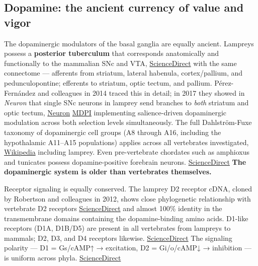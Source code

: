 \subsection{Dopamine: the ancient currency of value and vigor}\label{05_vertebrates-dopamine-the-ancient-currency-of-value-and-vigor}

The dopaminergic modulators of the basal ganglia are equally ancient. Lampreys possess a \textbf{posterior tuberculum} that corresponds anatomically and functionally to the mammalian SNc and VTA, \href{https://www.sciencedirect.com/science/chapter/handbook/abs/pii/B9780443298677000074}{ScienceDirect} with the same connectome --- afferents from striatum, lateral habenula, cortex/pallium, and pedunculopontine; efferents to striatum, optic tectum, and pallium. Pérez-Fernández and colleagues in 2014 traced this in detail; in 2017 they showed in \emph{Neuron} that single SNc neurons in lamprey send branches to \emph{both} striatum and optic tectum, \href{https://www.cell.com/neuron/fulltext/S0896-6273(17)30920-0}{Neuron} \href{https://mdpi.com/1422-0067/22/20/11284/htm}{MDPI} implementing salience-driven dopaminergic modulation across both selection levels simultaneously. The full Dahlström-Fuxe taxonomy of dopaminergic cell groups (A8 through A16, including the hypothalamic A11--A15 populations) applies across all vertebrates investigated, \href{https://en.wikipedia.org/wiki/Dopaminergic_cell_groups}{Wikipedia} including lamprey. Even pre-vertebrate chordates such as amphioxus and tunicates possess dopamine-positive forebrain neurons. \href{https://www.sciencedirect.com/science/chapter/handbook/abs/pii/B9780443298677000074}{ScienceDirect} \textbf{The dopaminergic system is older than vertebrates themselves.}

Receptor signaling is equally conserved. The lamprey D2 receptor cDNA, cloned by Robertson and colleagues in 2012, shows close phylogenetic relationship with vertebrate D2 receptors \href{https://www.sciencedirect.com/science/chapter/handbook/abs/pii/B9780443298677000074}{ScienceDirect} and almost 100\% identity in the transmembrane domains containing the dopamine-binding amino acids. D1-like receptors (D1A, D1B/D5) are present in all vertebrates from lampreys to mammals; D2, D3, and D4 receptors likewise. \href{https://www.sciencedirect.com/science/chapter/handbook/abs/pii/B9780443298677000074}{ScienceDirect} The signaling polarity --- D1 = Gs/cAMP↑ → excitation, D2 = Gi/o/cAMP↓ → inhibition --- is uniform across phyla. \href{https://www.sciencedirect.com/science/chapter/handbook/abs/pii/B9780443298677000074}{ScienceDirect}

